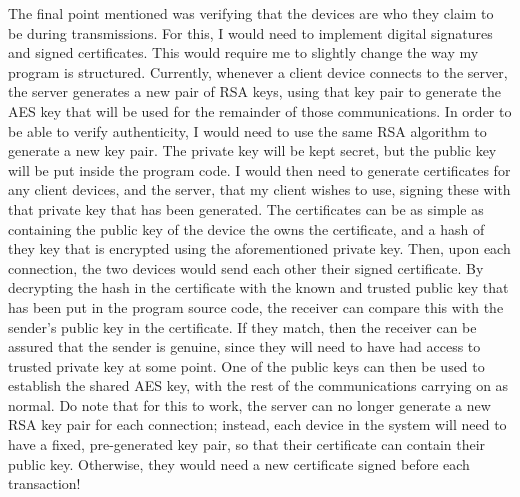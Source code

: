\documentclass[../main.tex]{subfiles}
\begin{document}
The final point mentioned was verifying that the devices are who they claim to be during transmissions. For this, I would need to implement digital signatures and signed certificates. This would require me to slightly change the way my program is structured. Currently, whenever a client device connects to the server, the server generates a new pair of RSA keys, using that key pair to generate the AES key that will be used for the remainder of those communications. In order to be able to verify authenticity, I would need to use the same RSA algorithm to generate a new key pair. The private key will be kept secret, but the public key will be put inside the program code. I would then need to generate certificates for any client devices, and the server, that my client wishes to use, signing these with that private key that has been generated. The certificates can be as simple as containing the public key of the device the owns the certificate, and a hash of they key that is encrypted using the aforementioned private key. Then, upon each connection, the two devices would send each other their signed certificate. By decrypting the hash in the certificate with the known and trusted public key that has been put in the program source code, the receiver can compare this with the sender's public key in the certificate. If they match, then the receiver can be assured that the sender is genuine, since they will need to have had access to trusted private key at some point. One of the public keys can then be used to establish the shared AES key, with the rest of the communications carrying on as normal. Do note that for this to work, the server can no longer generate a new RSA key pair for each connection; instead, each device in the system will need to have a fixed, pre-generated key pair, so that their certificate can contain their public key. Otherwise, they would need a new certificate signed before each transaction!
\end{document}
